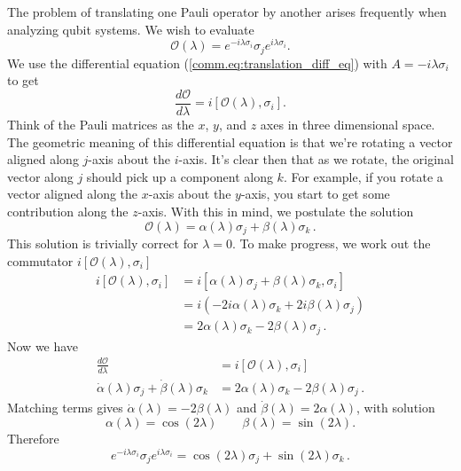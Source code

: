 The problem of translating one Pauli operator by another arises frequently when analyzing qubit systems.
We wish to evaluate
\begin{equation}
  \mathcal{O}(\lambda) = e^{-i\lambda\sigma_i}\sigma_j e^{i\lambda\sigma_i}.
\end{equation}
We use the differential equation (\ref{comm.eq:translation_diff_eq}) with $A=-i\lambda\sigma_i$ to get
\begin{equation}
  \frac{d\mathcal{O}}{d\lambda} = i[\mathcal{O}(\lambda),\sigma_i].
\end{equation}
Think of the Pauli matrices as the $x$, $y$, and $z$ axes in three dimensional space.
The geometric meaning of this differential equation is that we're rotating a vector aligned along $j$-axis about the $i$-axis.
It's clear then that as we rotate, the original vector along $j$ should pick up a component along $k$.
For example, if you rotate a vector aligned along the $x$-axis about the $y$-axis, you start to get some contribution along the $z$-axis.
With this in mind, we postulate the solution
\begin{equation}
  \mathcal{O}(\lambda) = \alpha(\lambda)\sigma_j + \beta(\lambda)\sigma_k \, .
\end{equation}
This solution is trivially correct for $\lambda = 0$.
To make progress, we work out the commutator $i[\mathcal{O}(\lambda),\sigma_i]$
\begin{align*}
  i[\mathcal{O}(\lambda),\sigma_i]
    &= i[\alpha(\lambda) \sigma_j + \beta(\lambda) \sigma_k, \sigma_i] \\
    &= i \left( -2i\alpha(\lambda) \sigma_k + 2i\beta(\lambda) \sigma_j \right) \\
    &= 2\alpha(\lambda) \sigma_k - 2\beta(\lambda) \sigma_j \, .
\end{align*}
Now we have
\begin{align*}
  \frac{d\mathcal{O}}{d\lambda}
    &= i \left[ \mathcal{O}(\lambda), \sigma_i \right] \\
  \dot{\alpha}(\lambda)\sigma_j + \dot{\beta}(\lambda) \sigma_k
    &= 2 \alpha(\lambda)\sigma_k - 2 \beta(\lambda) \sigma_j \, .
\end{align*}
Matching terms gives $\dot{\alpha}(\lambda) = -2\beta(\lambda)$ and $\dot{\beta}(\lambda) = 2\alpha(\lambda)$, with solution
\begin{equation}
  \alpha(\lambda) = \cos \left( 2\lambda \right) \qquad \beta(\lambda) = \sin \left( 2\lambda \right). \nonumber
\end{equation}
Therefore
\begin{equation}
  e^{-i\lambda\sigma_i}\sigma_j e^{i\lambda\sigma_i} = \cos \left( 2\lambda \right) \sigma_j + \sin \left( 2\lambda \right) \sigma_k \, .
\end{equation}
